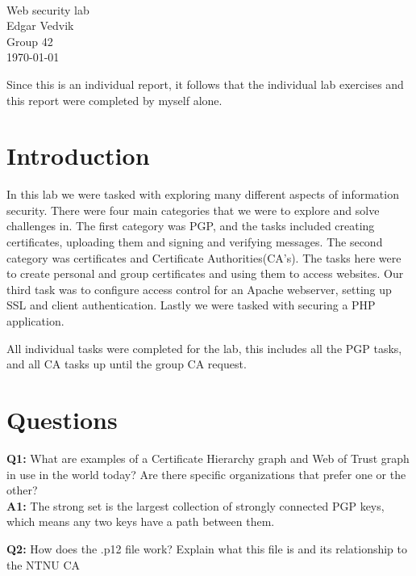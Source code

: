 \documentclass[paper=a4, fontsize=11pt]{article}
\begin{document}
\mbox{}\\[3pc]
\begin{center}
    \Huge{Web security lab}\\[2pc]

    \Large{Edgar Vedvik}\\[1pc]
    \large{Group 42}\\[2pc]
    \large{\today}
\end{center}
\vspace{5cm}
\begin{center}
    Since this is an individual report, it follows that the individual lab
    exercises and this report were completed by myself alone.
\end{center}
\newpage


\section{Introduction}
    In this lab we were tasked with exploring many different aspects of
    information security. There were four main categories that we were to
    explore and solve challenges in. The first category was PGP, and the tasks
    included creating certificates, uploading them and signing and verifying
    messages. The second category was certificates and Certificate
    Authorities(CA's). The tasks here were to create personal and group
    certificates and using them to access websites. Our third task was to
    configure access control for an Apache webserver, setting up SSL and client
    authentication. Lastly we were tasked with securing a PHP application.

    All individual tasks were completed for the lab, this includes all the PGP
    tasks, and all CA tasks up until the group CA request.

    

\section{Questions}
    \textbf{Q1:} What are examples of a Certificate Hierarchy graph and Web
    of Trust graph in use in the world today? Are there specific organizations
    that prefer one or the other?\\

    \textbf{A1:} The strong set is the largest collection of
    strongly connected PGP keys, which means any two keys have a path between
    them. 

    \textbf{Q2:} How does the .p12 file work? Explain what this file is and its
    relationship to the NTNU CA\\
\end{document}
